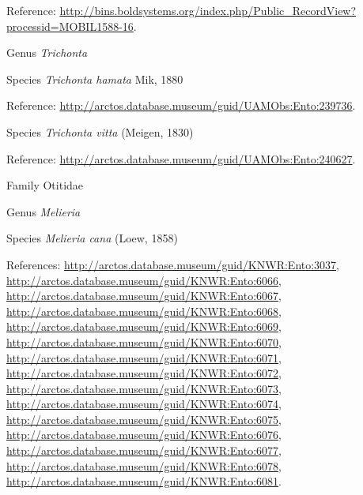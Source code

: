 \documentclass[9pt, article]{memoir}
\begin{document}
\begin{multicols}{2}
\vspace{6pt}Reference: 
\url{http://bins.boldsystems.org/index.php/Public_RecordView?processid=MOBIL1588-16}.

\vspace{6pt}\noindent\hspace{30pt}Genus \textit{Trichonta}


\vspace{6pt}\noindent\hspace{36pt}Species \textit{Trichonta hamata} Mik, 1880


\vspace{6pt}Reference: 
\url{http://arctos.database.museum/guid/UAMObs:Ento:239736}.

\vspace{6pt}\noindent\hspace{36pt}Species \textit{Trichonta vitta} (Meigen, 1830)


\vspace{6pt}Reference: 
\url{http://arctos.database.museum/guid/UAMObs:Ento:240627}.

\vspace{6pt}\noindent\hspace{24pt}Family Otitidae


\vspace{6pt}\noindent\hspace{30pt}Genus \textit{Melieria}


\vspace{6pt}\noindent\hspace{36pt}Species \textit{Melieria cana} (Loew, 1858)


\vspace{6pt}References: 
\url{http://arctos.database.museum/guid/KNWR:Ento:3037}, 
\url{http://arctos.database.museum/guid/KNWR:Ento:6066}, 
\url{http://arctos.database.museum/guid/KNWR:Ento:6067}, 
\url{http://arctos.database.museum/guid/KNWR:Ento:6068}, 
\url{http://arctos.database.museum/guid/KNWR:Ento:6069}, 
\url{http://arctos.database.museum/guid/KNWR:Ento:6070}, 
\url{http://arctos.database.museum/guid/KNWR:Ento:6071}, 
\url{http://arctos.database.museum/guid/KNWR:Ento:6072}, 
\url{http://arctos.database.museum/guid/KNWR:Ento:6073}, 
\url{http://arctos.database.museum/guid/KNWR:Ento:6074}, 
\url{http://arctos.database.museum/guid/KNWR:Ento:6075}, 
\url{http://arctos.database.museum/guid/KNWR:Ento:6076}, 
\url{http://arctos.database.museum/guid/KNWR:Ento:6077}, 
\url{http://arctos.database.museum/guid/KNWR:Ento:6078}, 
\url{http://arctos.database.museum/guid/KNWR:Ento:6081}.


\end{multicols}
\end{document}
